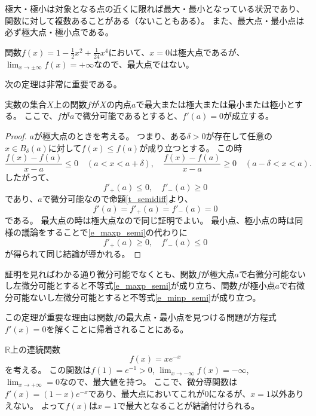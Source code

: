極大・極小は対象となる点の近くに限れば最大・最小となっている状況であり、関数に対して複数あることがある（ないこともある）。
また、最大点・最小点は必ず極大点・極小点である。

\begin{example}
関数$f(x) = 1-\frac{1}{2}x^2+\frac{1}{24}x^4$において、$x = 0$は極大点であるが、$\lim_{x \to \pm\infty}f(x) = +\infty$なので、最大点ではない。
\end{example}

次の定理は非常に重要である。

\begin{theorem}[最大値原理]
\label{t_maxp}
実数の集合$X$上の関数$f$が$X$の内点$a$で最大または極大または最小または極小とする。
ここで、$f$が$a$で微分可能であるとすると、$f'(a) = 0$が成立する。
\end{theorem}

\begin{proof}
$a$が極大点のときを考える。
つまり、ある$\delta > 0$が存在して任意の$x \in B_\delta(a)$に対して$f(x) \le f(a)$が成り立つとする。
この時
$$
\frac{f(x)-f(a)}{x-a} \le 0 \quad (a < x < a+\delta),
\quad \frac{f(x)-f(a)}{x-a} \ge 0 \quad (a-\delta < x < a).
$$
したがって、
\begin{equation}
\label{e_maxp_semi}
f'_+(a) \le 0,
\quad f'_-(a) \ge 0
\end{equation}
であり、$a$で微分可能なので命題\ref{t_semidiff}より、
$$
f'(a) = f'_+(a) = f'_-(a) = 0
$$
である。
最大点の時は極大点なので同じ証明でよい。
最小点、極小点の時は同様の議論をすることで\eqref{e_maxp_semi}の代わりに
\begin{equation}
\label{e_minp_semi}
f'_+(a) \ge 0,
\quad f'_-(a) \le 0
\end{equation}
が得られて同じ結論が導かれる。
\end{proof}

\begin{remark}
証明を見ればわかる通り微分可能でなくとも、関数$f$が極大点$a$で右微分可能ないし左微分可能とすると不等式\eqref{e_maxp_semi}が成り立ち、関数$f$が極小点$a$で右微分可能ないし左微分可能とすると不等式\eqref{e_minp_semi}が成り立つ。
\end{remark}

この定理が重要な理由は関数$f$の最大点・最小点を見つける問題が方程式$f'(x) = 0$を解くことに帰着されることにある。

\begin{example}
\label{t_gauss_est}
$\mathbb{R}$上の連続関数
$$
f(x) = x e^{-x}
$$
を考える。
この関数は$f(1) = e^{-1} > 0$, $\lim_{x \to -\infty}f(x) = -\infty$, $\lim_{x \to +\infty} = 0$なので、最大値を持つ。
ここで、微分導関数は$f'(x) = (1-x)e^{-x}$であり、最大点においてこれが$0$になるが、$x = 1$以外ありえない。
よって$f(x)$は$x = 1$で最大となることが結論付けられる。
\end{example}


